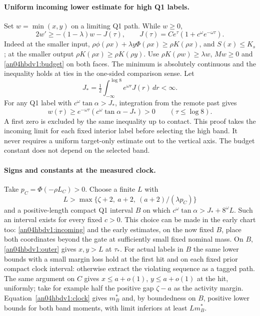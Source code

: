 \documentclass[11pt]{article}
\newcommand{\dd}{\,d}
\begin{document}
\paragraph{Uniform incoming lower estimate for high Q1 labels.}
Set $w=\min(x,y)$ on a limiting Q1 path. While $w\ge0$,
\[
 2w'\ge -(1-\lambda)w-J(\tau),\qquad
 J(\tau)=C e^\tau(1+c^\omega e^{-\omega\tau}).
\]
Indeed at the smaller input, $\rho\phi(\rho x)+\lambda y\Phi(\rho x)
\ge\rho K(\rho x)$, and $S(x)\le K_s$; at the smaller output
$\rho K(\rho x)\ge\rho K(\rho y)$. Use $\rho K(\rho w)\ge\lambda w$,
$Mw\ge0$ and \eqref{an04hbdv1:budget} on both faces. The minimum is
absolutely continuous and the inequality holds at ties in the
one-sided comparison sense. Let
\[
 J_*=\tfrac12\int_{-\infty}^{\log8} e^{\omega r}J(r)\dd r <\infty.
\]
For any Q1 label with $c^\omega\tan\alpha>J_*$,
integration from the remote past gives
\begin{equation}\label{an04hbdv1:outer}
 w(\tau)\ge e^{-\omega\tau}(c^\omega\tan\alpha-J_*)>0
 \qquad(\tau\le\log8).
\end{equation}
A first zero is excluded by the same inequality up to contact.
This proof takes the incoming limit for each fixed interior label
before selecting the high band. It never requires a uniform
target-only estimate out to the vertical axis. The budget constant
does not depend on the selected band.

\paragraph{Signs and constants at the measured clock.}
Take $p_C=\Phi(-\rho L_C)>0$. Choose a finite $L$ with
\[
 L>\max\{\zeta+2,\ a+2,\ (a+2)/(\lambda p_C)\}
\]
and a positive-length compact Q1 interval $B$ on which
$c^\omega\tan\alpha>J_*+8^\omega L$.
Such an interval exists for every fixed $c>0$. This choice can be
made in the early chart too: \eqref{an04hbdv1:incoming} and the
early estimates, on the now fixed $B$, place both coordinates beyond
the gate at sufficiently small fixed nominal mass.
On $B$, \eqref{an04hbdv1:outer} gives $x,y>L$ at $\tau_*$.
For actual labels in $B$ the same lower bounds with a small margin
loss hold at the first hit and on each fixed prior compact clock
interval: otherwise extract the violating sequence as a tagged path.
The same argument on $C$ gives $x\le a+o(1)$, $y\le a+o(1)$ at
the hit, uniformly; take for example half the positive gap
$\zeta-a$ as the activity margin. Equation~\eqref{an04hbdv1:clock}
gives $m_B^*$ and, by boundedness on $B$, positive lower bounds
for both band moments, with limit inferiors at least $L m_B^*$.
\end{document}
